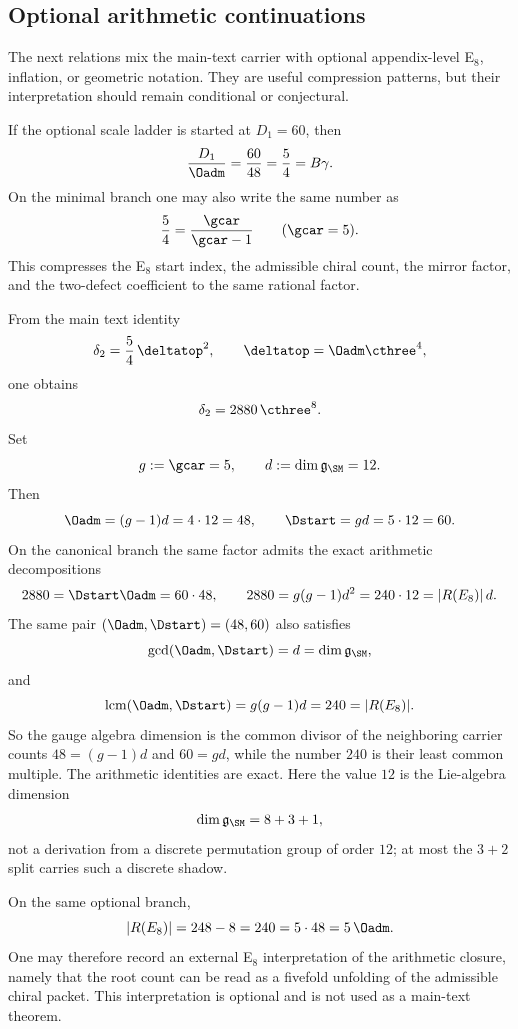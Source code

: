 \subsection{Optional arithmetic continuations}

The next relations mix the main-text carrier with optional appendix-level E$_8$, inflation, or geometric notation. They are useful compression patterns, but their interpretation should remain conditional or conjectural.

\begin{remark}
If the optional scale ladder is started at $D_1=60$, then
\[
\frac{D_1}{\Oadm}=\frac{60}{48}=\frac54=B\gamma.
\]
On the minimal branch one may also write the same number as
\[
\frac54=\frac{\gcar}{\gcar-1}\qquad (\gcar=5).
\]
This compresses the E$_8$ start index, the admissible chiral count, the mirror factor, and the two-defect coefficient to the same rational factor.
\end{remark}

\begin{corollary}\label{rem:defect-factorization-gcd-lcm}
From the main text identity
\[
\delta_2=\frac{5}{4}\,\deltatop^2,
\qquad
\deltatop=\Oadm\cthree^4,
\]
one obtains
\[
\delta_2=2880\,\cthree^8.
\]
Set
\[
g:=\gcar=5,
\qquad
d:=\dim\mathfrak g_{\SM}=12.
\]
Then
\[
\Oadm=(g-1)d=4\cdot 12=48,
\qquad
\Dstart=gd=5\cdot 12=60.
\]
On the canonical branch the same factor admits the exact arithmetic decompositions
\[
2880=\Dstart\Oadm=60\cdot48,
\qquad
2880=g(g-1)d^2=240\cdot12=|R(E_8)|\,d.
\]
The same pair $(\Oadm,\Dstart)=(48,60)$ also satisfies
\[
\gcd(\Oadm,\Dstart)
=
d=\dim \mathfrak g_{\SM},
\]
and
\[
\operatorname{lcm}(\Oadm,\Dstart)
=
g(g-1)d
=
240
=
|R(E_8)|.
\]
So the gauge algebra dimension is the common divisor of the neighboring carrier counts
$48=(g-1)d$ and $60=gd$, while the number $240$ is their least common multiple. The arithmetic
identities are exact. Here the value $12$ is the Lie-algebra dimension
\[
\dim\mathfrak g_{\SM}=8+3+1,
\]
not a derivation from a discrete permutation group of order $12$; at most the $3+2$ split carries
such a discrete shadow.
\end{corollary}

\begin{remark}
On the same optional branch,
\[
|R(E_8)|=248-8=240=5\cdot48=5\,\Oadm.
\]
One may therefore record an external E$_8$ interpretation of the arithmetic closure, namely that
the root count can be read as a fivefold unfolding of the admissible chiral packet. This
interpretation is optional and is not used as a main-text theorem.
\end{remark}

